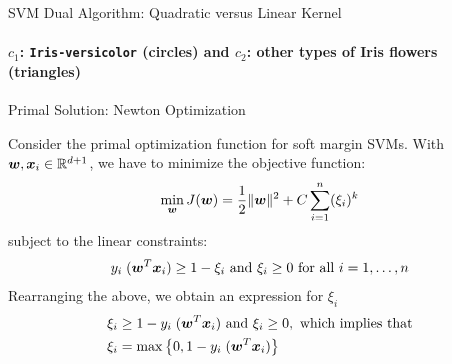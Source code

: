 \begin{frame}{SVM Dual Algorithm: Quadratic versus Linear Kernel}
  \framesubtitle{$c_1$: {\tt Iris-versicolor} (circles) and $c_2$: other
  types of Iris flowers (triangles)}
\begin{figure}[!t]
\end{figure}
\end{frame}



\begin{frame}{Primal Solution: Newton Optimization}

Consider the primal optimization function for soft margin SVMs.
With ${\boldsymbol w}, {\boldsymbol x}_i
\in {\mathord{\mathbb R}}^{d+1}$, we have to minimize the
objective function:
\begin{align*}
    \min_{{\boldsymbol w}} J({\boldsymbol w}) = \frac{1}{2} \| {\boldsymbol w} \|^2 + C \displaystyle \sum_{i=1}^n
    (\xi_i)^k
\end{align*}
subject to the linear constraints:
\begin{align*}
    y_i \; ({\boldsymbol w}^T{\boldsymbol x}_i) \ge 1 - \xi_i \text{ and } \xi_i \ge 0
    \text{ for all } i=1,\ldots,n
\end{align*}
Rearranging the above, we obtain an expression
for $\xi_i$
\begin{align*}
    \xi_i & \ge 1 - y_i \; ({\boldsymbol w}^T{\boldsymbol x}_i) \text{ and } \xi_i \ge
    0, \text{ which implies that} \notag\\
    \xi_i & = \max\left\{0, 1-y_i \; ({\boldsymbol w}^T{\boldsymbol x}_i)\right\} 
\end{align*}

\end{frame}


